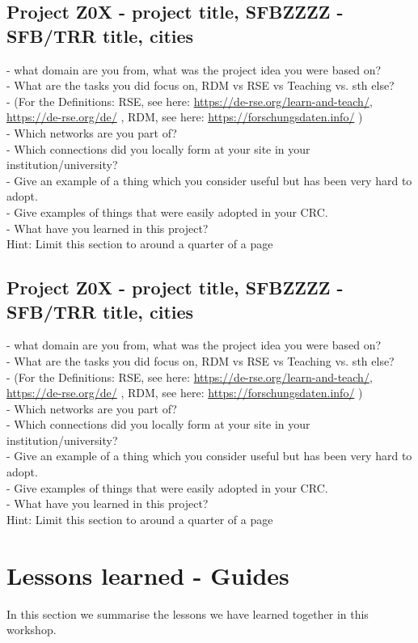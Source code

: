 \documentclass{eceasst}
\begin{document}
\subsection{Project Z0X - project title, SFBZZZZ - SFB/TRR title, cities}
- what domain are you from, what was the project idea you were based on?\\
- What are the tasks you did focus on, RDM vs RSE vs Teaching vs. sth else?\\
- (For the Definitions: RSE, see here: \url{https://de-rse.org/learn-and-teach/}, \url{https://de-rse.org/de/} , RDM, see here: \url{https://forschungsdaten.info/} )\\
- Which networks are you part of?\\
- Which connections did you locally form at your site in your institution/university?\\
- Give an example of a thing which you consider useful but has been very hard to adopt.\\
- Give examples of things that were easily adopted in your CRC.\\
- What have you learned in this project?\\
Hint: Limit this section to around a quarter of a page


\subsection{Project Z0X - project title, SFBZZZZ - SFB/TRR title, cities}
- what domain are you from, what was the project idea you were based on?\\
- What are the tasks you did focus on, RDM vs RSE vs Teaching vs. sth else?\\
- (For the Definitions: RSE, see here: \url{https://de-rse.org/learn-and-teach/}, \url{https://de-rse.org/de/} , RDM, see here: \url{https://forschungsdaten.info/} )\\
- Which networks are you part of?\\
- Which connections did you locally form at your site in your institution/university?\\
- Give an example of a thing which you consider useful but has been very hard to adopt.\\
- Give examples of things that were easily adopted in your CRC.\\
- What have you learned in this project?\\
Hint: Limit this section to around a quarter of a page

\section{Lessons learned - Guides}
In this section we summarise the lessons we have learned together in this workshop.
\end{document}
